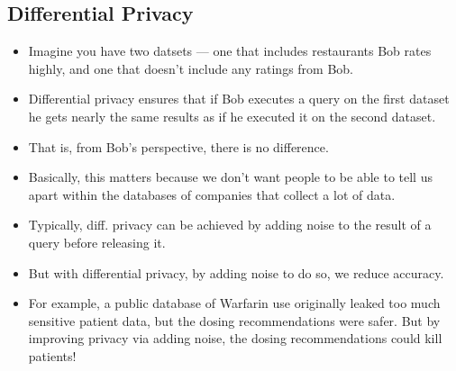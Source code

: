 \documentclass{article}
\begin{document}
\subsection{Differential Privacy}
\begin{itemize}
    \item Imagine you have two datsets --- one that includes restaurants Bob rates highly, and one that doesn't include any ratings from Bob.
    \item Differential privacy ensures that if Bob executes a query on the first dataset he gets nearly the same results as if he executed it on the second dataset.
    \item That is, from Bob's perspective, there is no difference.
    \item Basically, this matters because we don't want people to be able to tell us apart within the databases of companies that collect a lot of data.
    \item Typically, diff. privacy can be achieved by adding noise to the result of a query before releasing it.
    \item But with differential privacy, by adding noise to do so, we reduce accuracy.
    \item For example, a public database of Warfarin use originally leaked too much sensitive patient data, but the dosing recommendations were safer.  But by improving privacy via adding noise, the dosing recommendations could kill patients!
\end{itemize}
\end{document}
